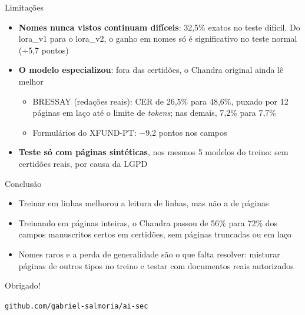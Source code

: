 \documentclass[aspectratio=169,11pt]{beamer}
\begin{document}
\begin{frame}{Limitações}
\small
\begin{itemize}
  \item \textbf{Nomes nunca vistos continuam difíceis}: 32,5\% exatos no teste difícil. Do lora\_v1 para o lora\_v2, o ganho em nomes só é significativo no teste normal (+5,7 pontos)
  \item \textbf{O modelo especializou}: fora das certidões, o Chandra original ainda lê melhor
  \begin{itemize}
    \item BRESSAY (redações reais): CER de 26,5\% para 48,6\%, puxado por 12 páginas em laço até o limite de \emph{tokens}; nas demais, 7,2\% para 7,7\%
    \item Formulários do XFUND-PT: $-$9,2 pontos nos campos
  \end{itemize}
  \item \textbf{Teste só com páginas sintéticas}, nos mesmos 5 modelos do treino: sem certidões reais, por causa da LGPD
\end{itemize}
\end{frame}

\begin{frame}{Conclusão}
\begin{itemize}
  \item Treinar em linhas melhorou a leitura de linhas, mas não a de páginas
  \item Treinando em páginas inteiras, o Chandra passou de 56\% para 72\% dos campos manuscritos certos em certidões, sem páginas truncadas ou em laço
  \item Nomes raros e a perda de generalidade são o que falta resolver: misturar páginas de outros tipos no treino e testar com documentos reais autorizados
\end{itemize}
\end{frame}

\begin{frame}[standout]
Obrigado!

\vspace{0.5em}
\normalsize \texttt{github.com/gabriel-salmoria/ai-sec}
\end{frame}
\end{document}

